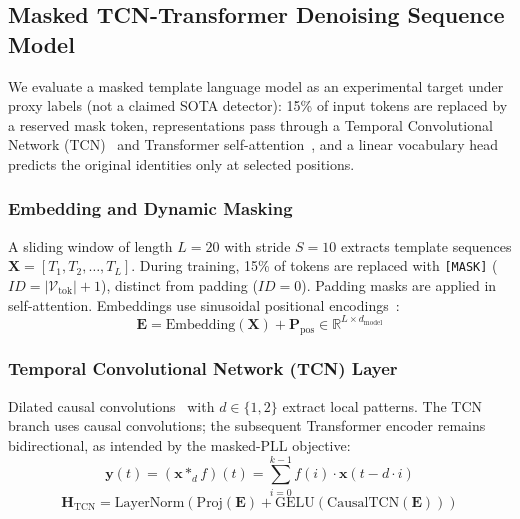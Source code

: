 \documentclass[a4paper]{llncs}
\begin{document}
\subsection{Masked TCN-Transformer Denoising Sequence Model}
We evaluate a masked template language model as an experimental target under proxy labels (not a claimed SOTA detector): 15\% of input tokens are replaced by a reserved mask token, representations pass through a Temporal Convolutional Network (TCN)~\cite{ref_tcn} and Transformer self-attention~\cite{ref_attention}, and a linear vocabulary head predicts the original identities only at selected positions.

\subsubsection{Embedding and Dynamic Masking}
A sliding window of length $L = 20$ with stride $S = 10$ extracts template sequences $\mathbf{X} = [T_1, T_2, \ldots, T_L]$. During training, 15\% of tokens are replaced with \texttt{[MASK]} ($ID = |\mathcal{V}_{\mathrm{tok}}|+1$), distinct from padding ($ID = 0$). Padding masks are applied in self-attention. Embeddings use sinusoidal positional encodings~\cite{ref_attention}:
\begin{equation}
    \mathbf{E} = \text{Embedding}(\mathbf{X}) + \mathbf{P}_{\text{pos}} \in \mathbb{R}^{L \times d_{\text{model}}}
\end{equation}

\subsubsection{Temporal Convolutional Network (TCN) Layer}
Dilated causal convolutions~\cite{ref_tcn} with $d \in \{1, 2\}$ extract local patterns. The TCN branch uses causal convolutions; the subsequent Transformer encoder remains bidirectional, as intended by the masked-PLL objective:
\begin{equation}
    \mathbf{y}(t) = (\mathbf{x} *_d f)(t) = \sum_{i=0}^{k-1} f(i) \cdot \mathbf{x}(t - d \cdot i)
\end{equation}
\begin{equation}
    \mathbf{H}_{\text{TCN}} = \text{LayerNorm}(\text{Proj}(\mathbf{E}) + \text{GELU}(\text{CausalTCN}(\mathbf{E})))
\end{equation}
\end{document}
